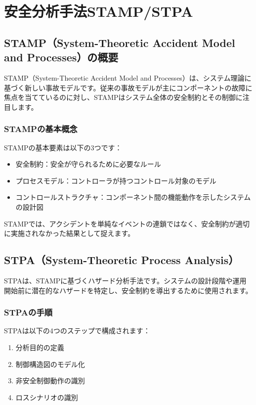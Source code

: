 \chapter{安全分析手法STAMP/STPA}
\label{chap3}

\section{STAMP（System-Theoretic Accident Model and Processes）の概要}

STAMP（System-Theoretic Accident Model and Processes）は、システム理論に基づく新しい事故モデルです。従来の事故モデルが主にコンポーネントの故障に焦点を当てているのに対し、STAMPはシステム全体の安全制約とその制御に注目します。

\subsection{STAMPの基本概念}

STAMPの基本要素は以下の3つです：

\begin{itemize}
    \item 安全制約：安全が守られるために必要なルール
    \item プロセスモデル：コントローラが持つコントロール対象のモデル
    \item コントロールストラクチャ：コンポーネント間の機能動作を示したシステムの設計図
\end{itemize}

STAMPでは、アクシデントを単純なイベントの連鎖ではなく、安全制約が適切に実施されなかった結果として捉えます。

\section{STPA（System-Theoretic Process Analysis）}

STPAは、STAMPに基づくハザード分析手法です。システムの設計段階や運用開始前に潜在的なハザードを特定し、安全制約を導出するために使用されます。

\subsection{STPAの手順}

STPAは以下の4つのステップで構成されます：

\begin{enumerate}
    \item 分析目的の定義
    \item 制御構造図のモデル化
    \item 非安全制御動作の識別
    \item ロスシナリオの識別
\end{enumerate}

